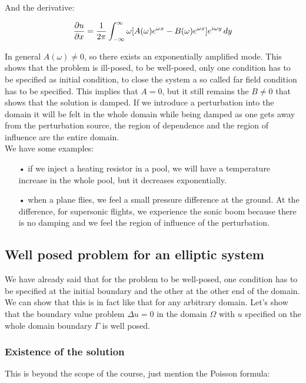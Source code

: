 And the derivative:

\begin{equation}
\frac{\partial u}{\partial x} = \frac{1}{2\pi} \int _{-\infty} ^\infty \omega [A(\omega) e^{\omega x}-B(\omega) e^{\omega x}] e^{i\omega y}\, dy
\end{equation}

In general $A(\omega) \neq 0$, so there exists an exponentially amplified mode. This shows that the problem is ill-posed, to be well-posed, only one condition has to be specified as initial condition, to close the system a so called far field condition has to be specified. This implies that $A = 0$, but it still remains the $B \neq 0$ that shows that the solution is damped. If we introduce a perturbation into the domain it will be felt in the whole domain while being damped as one gets away from the perturbation source, the region of dependence and the region of influence are the entire domain. \\

We have some examples: 
\begin{itemize}
\item[•] if we inject a heating resistor in a pool, we will have a temperature increase in the whole pool, but it decreases exponentially.
\item[•] when a plane flies, we feel a small pressure difference at the ground. At the difference, for supersonic flights, we experience the sonic boom because there is no damping and we feel the region of influence of the perturbation. 
\end{itemize}

\subsection{Well posed problem for an elliptic system}
We have already said that for the problem to be well-posed, one condition has to be specified at the initial boundary and the other at the other end of the domain. We can show that this is in fact like that for any arbitrary domain. Let's show that the boundary value problem $\Delta u = 0$ in the domain $\Omega$ with $u$ specified on the whole domain boundary $\Gamma$ is well posed. 

\subsubsection{Existence of the solution}
This is beyond the scope of the course, just mention the Poisson formula: 

